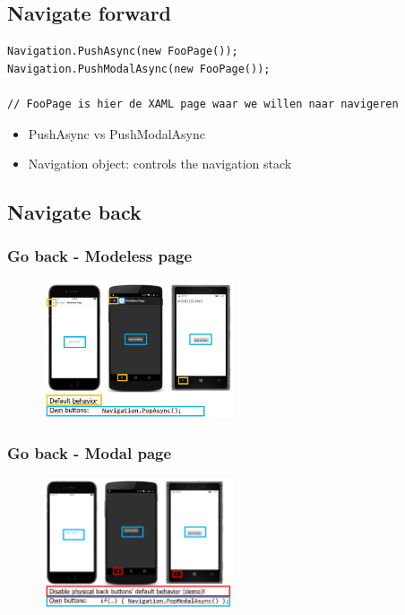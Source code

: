 \documentclass{article}
\begin{document}
\subsection{Navigate forward}

\begin{verbatim}
Navigation.PushAsync(new FooPage());
Navigation.PushModalAsync(new FooPage());

// FooPage is hier de XAML page waar we willen naar navigeren
\end{verbatim}

\begin{itemize}
    \item PushAsync vs PushModalAsync
    \item Navigation object: controls the navigation stack
\end{itemize}

\subsection{Navigate back}

\subsubsection{Go back - Modeless page}

\begin{figure}[H]
    \centering
    \includegraphics[width=0.5\textwidth]{navigation-back-modeless.png}
    \caption{}
\end{figure}

\subsubsection{Go back - Modal page}

\begin{figure}[H]
    \centering
    \includegraphics[width=0.5\textwidth]{navigation-back-modal.png}
    \caption{}
\end{figure}
\end{document}
